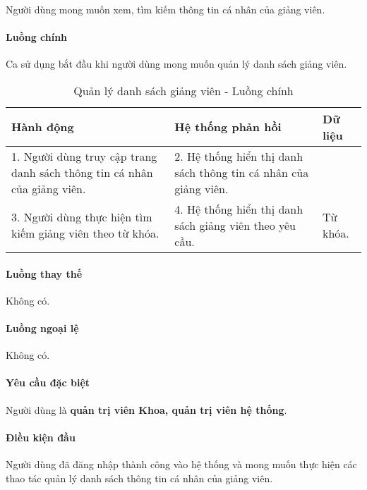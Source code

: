 \documentclass[./../main.tex]{subfiles}
\begin{document}
Người dùng mong muốn xem, tìm kiếm thông tin cá nhân của giảng viên.

\paragraph*{Luồng chính} Ca sử dụng bắt đầu khi người dùng mong muốn quản lý danh sách giảng viên.

\begin{table}[H]
	\caption{Quản lý danh sách giảng viên - Luồng chính}
	\label{tab:orgAdmin_manage_lecturers}
	\begin{tabularx}{\textwidth}{|X|X|X|}
		\hline
		\textbf{Hành động}                                                       & \textbf{Hệ thống phản hồi}                                       & \textbf{Dữ liệu} \\ \hline
		1. Người dùng truy cập trang danh sách thông tin cá nhân của giảng viên. & 2. Hệ thống hiển thị danh sách thông tin cá nhân của giảng viên. &                  \\ \hline
		3. Người dùng thực hiện tìm kiếm giảng viên theo từ khóa.                & 4. Hệ thống hiển thị danh sách giảng viên theo yêu cầu.          & Từ khóa.         \\ \hline
	\end{tabularx}
\end{table}

\paragraph*{Luồng thay thế} Không có.

\paragraph*{Luồng ngoại lệ} Không có.

\paragraph*{Yêu cầu đặc biệt}

Người dùng là \textbf{quản trị viên Khoa, quản trị viên hệ thống}.

\paragraph*{Điều kiện đầu}

Người dùng đã đăng nhập thành công vào hệ thống và mong muốn thực hiện các thao tác quản lý danh sách thông tin cá nhân của giảng viên.
\end{document}
